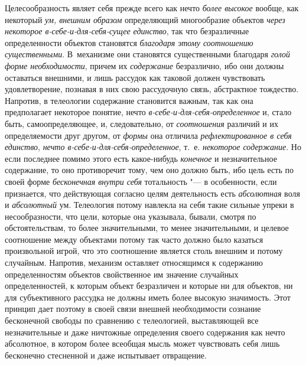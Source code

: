 {{Целесообразность являет себя прежде всего как нечто
{\em более высокое}
вообще, как некоторый
{\em ум, внешним образом}
определяющий многообразие объектов
{\em через некоторое
в-себе-и-для-себя-сущее единство}, так что безразличные
определенности объектов становятся
{\em благодаря этому соотношению
существенными}. В~механизме они становятся существенными
благодаря {\em голой форме
необходимости}, причем их
{\em содержание}
безразлично, ибо они должны оставаться внешними, и лишь
рассудок как таковой должен чувствовать удовлетворение, познавая в них свою
рассудочную связь, абстрактное тождество. Напротив, в телеологии содержание
становится важным, так как она предполагает некоторое понятие, нечто
{\em в-себе-и-для-себя-определенное}
и, стало быть, самоопределяющее, и, следовательно, от
{\em соотношения}
различий и их определяемости друг другом, от
{\em формы} она отличила
{\em рефлектированное в себя единство},
{\em нечто
в-себе-и-для-себя-определенное}, т.~е.
{\em некоторое содержание}.
Но если последнее помимо этого есть какое-нибудь
{\em конечное} и
незначительное содержание, то оно противоречит тому, чем оно должно быть,
ибо цель есть по своей форме
{\em бесконечная внутри себя}
тотальность "--- в особенности, если признается,
что действующая согласно целям деятельность есть
{\em абсолютная} воля и
{\em абсолютный} ум.
Телеология потому навлекла на себя такие сильные упреки в несообразности,
что цели, которые она указывала, бывали, смотря по обстоятельствам, то
более значительными, то менее значительными, и целевое соотношение между
объектами потому так часто должно было казаться произвольной игрой, что это
соотношение является столь внешним и потому случайным. Напротив, механизм
оставляет относящимся к содержанию определенностям объектов свойственное им
значение случайных определенностей, к которым объект безразличен и которые
ни для объектов, ни для субъективного рассудка не должны
иметь более высокую значимость. Этот принцип дает поэтому в своей связи
внешней необходимости сознание бесконечной свободы по сравнению с
телеологией, выставляющей все незначительные и даже ничтожные определения
своего содержания как нечто абсолютное, в котором более всеобщая мысль
может чувствовать себя лишь бесконечно стесненной и даже испытывает
отвращение.

}}
